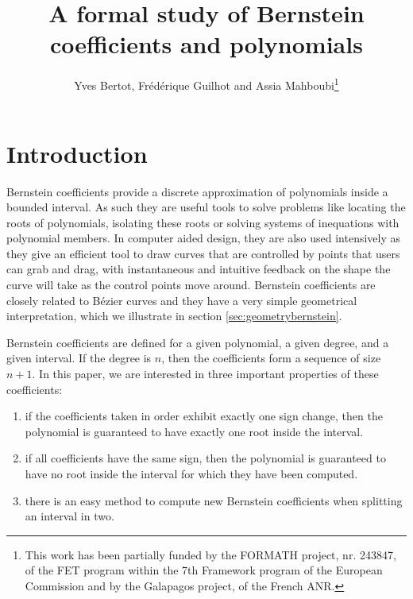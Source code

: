 \documentclass{mscs}
\begin{document}
\title{A formal study of Bernstein coefficients and polynomials}
\author[Y. Bertot, F. Guilhot and A. Mahboubi]{Yves Bertot,
  Fr\'ed\'erique Guilhot and Assia
  Mahboubi\thanks{This work has been partially funded by the FORMATH
    project, nr. 243847, of the FET program within the 7th Framework
    program of the European Commission and by the Galapagos project, of the
    French ANR.
}}


\newtheorem{lemma}{Lemma}[section]
\newtheorem{definition}{Definition}[section]
\newtheorem{theorem}{Theorem}[section]

\maketitle

\section{Introduction}
Bernstein coefficients provide a discrete approximation of polynomials
inside a bounded interval. As such they are useful tools to solve
problems like locating the roots of polynomials, isolating these roots
or solving systems of inequations with polynomial members.  In
computer aided design, they are also used intensively as they give an
efficient tool to draw curves that are controlled by points that users
can grab and drag, with instantaneous and intuitive feedback on the
shape the curve will take as the control points move around.
Bernstein coefficients are closely related to B\'ezier curves
and they have a very simple geometrical interpretation, which we illustrate
in section \ref{sec:geometrybernstein}.

Bernstein coefficients are defined for a given polynomial, a given
degree, and a given interval. If the degree is \(n\), then
the coefficients form a sequence of size \(n+1\). In
this paper, we are interested in three important properties of these
coefficients:
\begin{enumerate}
\item if the coefficients taken in order exhibit exactly one sign change,
  then the polynomial is guaranteed to have exactly one root inside
  the interval.
\item  if all coefficients have the same sign, then the
  polynomial is guaranteed to have no root inside the interval
  for which they have been computed.
\item there is an easy method to compute new Bernstein coefficients when
 splitting an interval in two.
\end{enumerate}
\end{document}
